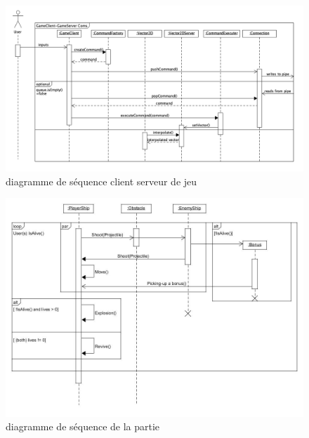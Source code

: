 \documentclass[french]{article}
\begin{document}
\begin{figure}[!htbp]
    \centering
    \includegraphics[scale=0.55, angle=90]{sequence_diagram/game_client_server_sequence.png}
    \caption{diagramme de séquence client serveur de jeu}
    \label{sequence diagram:game client server}
\end{figure}
\restoregeometry

\begin{figure}[!htbp]%
    \centering
    \includegraphics[scale=0.5]{sequence_diagram/game_sequence.jpg}
    \caption{diagramme de séquence de la partie}
    \label{sequence diagram:game}
\end{figure}
\end{document}
